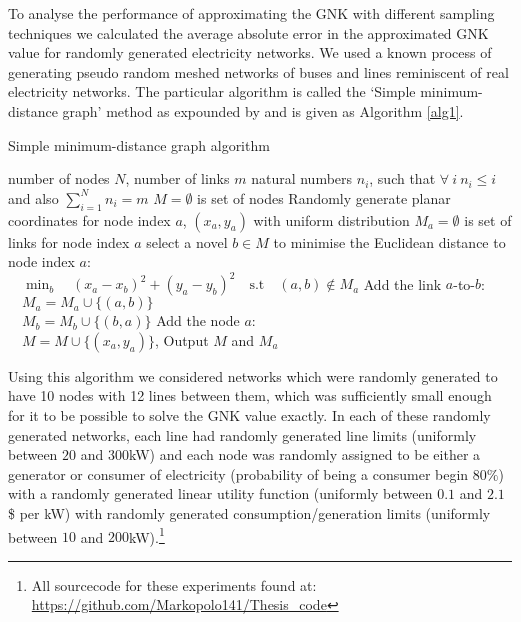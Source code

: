 To analyse the performance of approximating the GNK with different sampling techniques we calculated the average absolute error in the approximated GNK value for randomly generated electricity networks.
We used a known process of generating pseudo random meshed networks of buses and lines reminiscent of real electricity networks. The particular algorithm is called the `Simple minimum-distance graph' method as expounded by \cite{hines1} and is given as Algorithm \ref{alg1}.

\begin{algorithm}[]
\caption{Simple minimum-distance graph algorithm}
\label{alg1}
\begin{algorithmic}
    \REQUIRE number of nodes $N$, number of links $m$
    \REQUIRE natural numbers $n_i$, such that $\forall~i~n_i\leq i$ and also $\sum_{i=1}^Nn_i=m$
    \STATE $M=\emptyset$ is set of nodes
        \STATE Randomly generate planar coordinates for node index $a$, $(x_a ,y_a)$ with uniform distribution
        \STATE $M_a=\emptyset$ is set of links for node index $a$
            \STATE select a novel $b\in M$ to minimise the Euclidean distance to node index $a$:\\ $\quad\min_b\quad (x_a-x_b)^2+(y_a-y_b)^2\quad\text{s.t}\quad (a, b)\notin M_a$
            \STATE Add the link $a$-to-$b$:\\ $\quad M_a=M_a\cup \{(a, b)\}$\\ $\quad M_b=M_b\cup \{(b, a)\}$
        \ENDFOR
        \STATE Add the node $a$:\\ $\quad M=M\cup \{(x_a ,y_a)\}$, 
    \ENDFOR
    \STATE Output $M$ and $M_a$ 
\end{algorithmic}
\end{algorithm}


\iffigures

\fi

Using this algorithm we considered networks which were randomly generated to have 10 nodes with 12 lines between them, which was sufficiently small enough for it to be possible to solve the GNK value exactly.
In each of these randomly generated networks, each line had randomly generated line limits (uniformly between $20$ and $300$kW) and each node was randomly assigned to be either a generator or consumer of electricity (probability of being a consumer begin $80\%$) with a randomly generated linear utility function (uniformly between $0.1$ and $2.1$ \$ per kW) with randomly generated consumption/generation limits (uniformly between $10$ and $200$kW).\footnote{All sourcecode for these experiments found at: \href{https://github.com/Markopolo141/Thesis\_code}{https://github.com/Markopolo141/Thesis\_code}}

